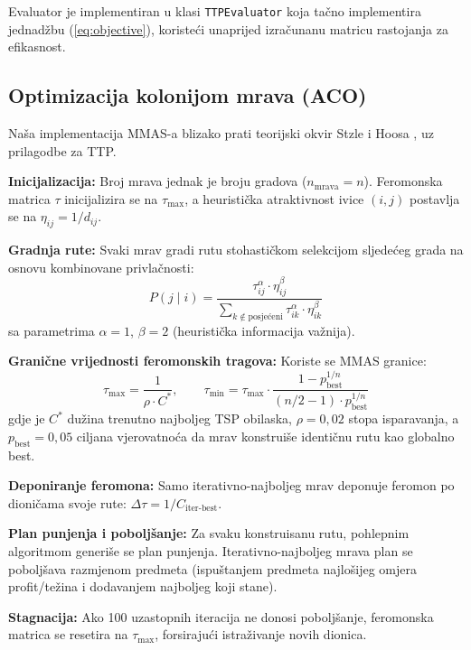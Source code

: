 \documentclass[12pt,a4paper]{article}
\begin{document}
Evaluator je implementiran u klasi \texttt{TTPEvaluator} koja ta\v{c}no implementira jednad\v{z}bu (\ref{eq:objective}), koriste\'{c}i unaprijed izra\v{c}unanu matricu rastojanja za efikasnost.

\subsection{Optimizacija kolonijom mrava (ACO)}

Na\v{s}a implementacija MMAS-a blizako prati teorijski okvir Stzle i Hoosa \cite{stutzle2000}, uz prilagodbe za TTP.

\textbf{Inicijalizacija:} Broj mrava jednak je broju gradova ($n_{\text{mrava}} = n$). Feromonska matrica $\tau$ inicijalizira se na $\tau_{\max}$, a heuristi\v{c}ka atraktivnost ivice $(i, j)$ postavlja se na $\eta_{ij} = 1/d_{ij}$.

\textbf{Gradnja rute:} Svaki mrav gradi rutu stohasti\v{c}kom selekcijom sljede\'{c}eg grada na osnovu kombinovane privla\v{c}nosti:
\begin{equation}
    P(j \mid i) = \frac{\tau_{ij}^\alpha \cdot \eta_{ij}^\beta}{\sum_{k \notin \text{posje\'{c}eni}} \tau_{ik}^\alpha \cdot \eta_{ik}^\beta}
\end{equation}
sa parametrima $\alpha = 1$, $\beta = 2$ (heuristi\v{c}ka informacija va\v{z}nija).

\textbf{Grani\v{c}ne vrijednosti feromonskih tragova:} Koriste se MMAS granice:
\begin{equation}
    \tau_{\max} = \frac{1}{\rho \cdot C^*}, \qquad
    \tau_{\min} = \tau_{\max} \cdot \frac{1 - p_{\text{best}}^{1/n}}{(n/2 - 1) \cdot p_{\text{best}}^{1/n}}
\end{equation}
gdje je $C^*$ du\v{z}ina trenutno najboljeg TSP obilaska, $\rho = 0{,}02$ stopa isparavanja, a $p_{\text{best}} = 0{,}05$ ciljana vjerovatno\'{c}a da mrav konstrui\v{s}e identičnu rutu kao globalno best.

\textbf{Deponiranje feromona:} Samo iterativno-najboljeg mrav deponuje feromon po dioni\v{c}ama svoje rute: $\Delta\tau = 1 / C_{\text{iter-best}}$.

\textbf{Plan punjenja i pobolj\v{s}anje:} Za svaku konstruisanu rutu, pohlepnim algoritmom generi\v{s}e se plan punjenja. Iterativno-najboljeg mrava plan se pobolj\v{s}ava razmjenom predmeta (ispuštanjem predmeta najlo\v{s}ijeg omjera profit/te\v{z}ina i dodavanjem najboljeg koji stane).

\textbf{Stagnacija:} Ako 100 uzastopnih iteracija ne donosi pobolj\v{s}anje, feromonska matrica se resetira na $\tau_{\max}$, forsiraju\'{c}i istra\v{z}ivanje novih dionica.
\end{document}
